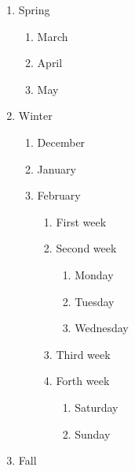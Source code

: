 \documentclass[20pt]{article}
\begin{document}
  
            \begin{enumerate}  
                  \item Spring 
                        \begin{enumerate}  
                                \item March       
                                \item April 
                                \item May
                                \end{enumerate}                  
                  \item Winter  
                        \begin{enumerate}  
                              \item December       
                              \item January      
                              \item February
                                 \begin{enumerate}  
                                    \item First week   
                                    \item Second week
                                         \begin{enumerate}  
                                               \item Monday  
                                               \item Tuesday
                                               \item Wednesday
                                         \end{enumerate}
                                    \item Third week
                                    \item Forth week
                                         \begin{enumerate}  
                                               \item Saturday  
                                               \item Sunday
                                         \end{enumerate}  
                                 \end{enumerate}  
                     \end{enumerate}  
                     \item Fall
           \end{enumerate}  
      
\end{document}
